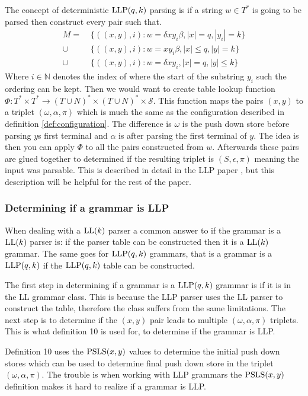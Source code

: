 The concept of deterministic $\text{LLP}(q,k)$ parsing is if a string $w \in T^*$ is going to be parsed then construct every pair such that.
\begin{align*}
    M =&\; \{((x, y), i) : w = \delta xy_i \beta, |x| = q, |y_i| = k\} \\
    \cup&\; \{((x, y), i) : w = xy_i \beta, |x| \leq q, |y| = k\} \\
    \cup&\; \{((x, y), i) : w = \delta xy_i, |x| = q, |y| \leq k\}
\end{align*}
Where $i \in \mathbb{N}$ denotes the index of where the start of the substring $y_i$ such the ordering can be kept. Then we would want to create table lookup function $\Phi: T^* \times T^* \to (T \cup N)^* \times (T \cup N)^* \times \mathcal{S}$. This function maps the pairs $(x,y)$ to a triplet $(\omega, \alpha, \pi)$ which is much the same as the configuration described in definition \ref{def:configuration}. The difference is $\omega$ is the push down store before parsing $y$s first terminal and $\alpha$ is after parsing the first terminal of $y$. The idea is then you can apply $\Phi$ to all the pairs constructed from $w$. Afterwards these pairs are glued together to determined if the resulting triplet is $(S, \epsilon, \pi)$ meaning the input was parsable. This is described in detail in the LLP paper \cite[7]{Vagner2007}, but this description will be helpful for the rest of the paper.

\subsubsection{Determining if a grammar is LLP}
When dealing with a $\text{LL}(k)$ parser a common answer to if the grammar is a $\text{LL}(k)$ parser is: if the parser table can be constructed then it is a $\text{LL}(k)$ grammar. The same goes for $\text{LLP}(q,k)$ grammars, that is a grammar is a $\text{LLP}(q,k)$ if the $\text{LLP}(q, k)$ table can be constructed.

The first step in determining if a grammar is a $\text{LLP}(q,k)$ grammar is if it is in the LL grammar class. This is because the LLP parser uses the LL parser to construct the table, therefore the class suffers from the same limitations. The next step is to determine if the $(x, y)$ pair leads to multiple $(\omega, \alpha, \pi)$ triplets. This is what definition 10 \cite[13]{Vagner2007} is used for, to determine if the grammar is LLP.

Definition 10 \cite[13]{Vagner2007} uses the $\text{PSLS}(x, y)$ \cite[12]{Vagner2007} values to determine the initial push down stores which can be used to determine final push down store in the triplet $(\omega, \alpha, \pi)$. The trouble is when working with LLP grammars the $\text{PSLS}(x, y)$ definition makes it hard to realize if a grammar is LLP.

